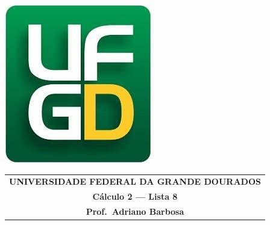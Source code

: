 \documentclass[a4paper,5pt]{amsbook}
\begin{document}
\thispagestyle{empty}
\pagestyle{empty}
\begin{minipage}[h]{0.14\textwidth}
	\includegraphics[scale=0.24]{../../ufgd.png}
\end{minipage}
\begin{minipage}[h]{\textwidth}
\begin{tabular}{c}
{{\bf UNIVERSIDADE FEDERAL DA GRANDE DOURADOS}}\\
{{\bf C\'alculo 2 --- Lista 8}}\\
{{\bf Prof.\ Adriano Barbosa}}\\
\end{tabular}
\vspace{-0.45cm}
%
\end{minipage}

\end{document}
